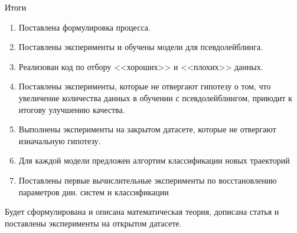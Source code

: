 \documentclass[10pt]{beamer}
\theoremstyle{definition}
\begin{document}
	\begin{frame}{Итоги}
		\begin{enumerate}
			\item Поставлена формулировка процесса.
                \item Поставлены эксперименты и обучены модели для псевдолейблинга.
                \item Реализован код по отбору <<хороших>> и <<плохих>> данных.
                \item Поставлены эксперименты, которые не отвергают гипотезу о том, что увеличение количества данных в обучении с псевдолейблингом, приводит к итогову улучшению качества.
                \item Выполнены эксперименты на закрытом датасете, которые не отвергают изначальную гипотезу.
			\item Для каждой модели предложен алгортим классификации новых траекторий
			\item Поставлены первые вычислительные эксперименты по восстановлению параметров дин. систем и классификации 
		\end{enumerate}
		
		Будет сформулирована и описана математическая теория, 
дописана статья и поставлены эксперименты на открытом датасете.
	\end{frame}	
	
\end{document}
